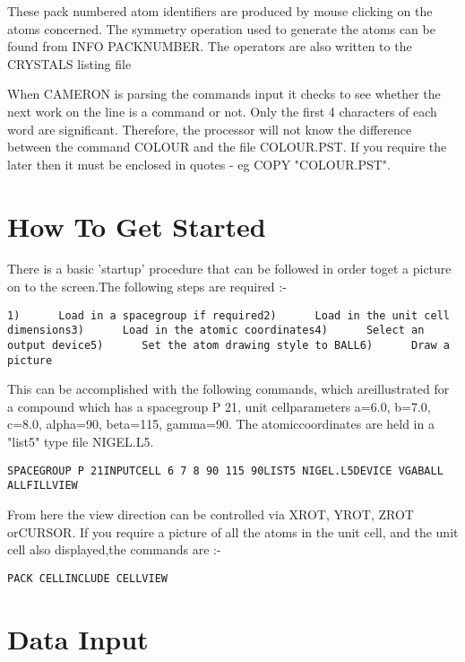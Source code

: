\documentclass[10pt,a4paper]{report}
\begin{document}
These pack numbered atom identifiers are produced by mouse clicking on
the atoms concerned. The symmetry operation used to generate the atoms 
can be found from INFO PACKNUMBER.  The operators are also written to
the CRYSTALS listing file





When CAMERON is parsing the commands input it checks to see whether
the next work on the line is a command or not. Only the first 4
characters of each word are significant. Therefore, the processor will
not know the difference between the command COLOUR and the file
COLOUR.PST. If you require the later then it must be enclosed in quotes
- eg COPY "COLOUR.PST".
\chapter{How To Get Started}

There is a basic 'startup' procedure that can be followed in order toget a picture on to the screen.The following steps are required :-\small\begin{verbatim}1)      Load in a spacegroup if required2)      Load in the unit cell dimensions3)      Load in the atomic coordinates4)      Select an output device5)      Set the atom drawing style to BALL6)      Draw a picture\end{verbatim}\normalsize

This can be accomplished with the following commands, which areillustrated for a compound which has a spacegroup P 21, unit cellparameters a=6.0, b=7.0, c=8.0, alpha=90, beta=115, gamma=90. The atomiccoordinates are held in a "list5" type file NIGEL.L5.\small\begin{verbatim}SPACEGROUP P 21INPUTCELL 6 7 8 90 115 90LIST5 NIGEL.L5DEVICE VGABALL ALLFILLVIEW\end{verbatim}\normalsize



From here the view direction can be controlled via XROT, YROT, ZROT orCURSOR. If you require a picture of all the atoms in the unit cell, and the unit cell also displayed,the commands are :-\small\begin{verbatim}PACK CELLINCLUDE CELLVIEW\end{verbatim}\normalsize

\chapter{Data Input}
\end{document}

